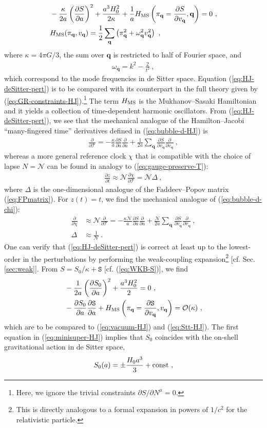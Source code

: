 \documentclass[12pt]{iopart}
\def\eq#1{\begin{equation}\begin{aligned}#1\end{aligned}\end{equation}}
\def\eref#1{(\ref{eq:#1})}
\def\del#1#2{\frac{\partial#1}{\partial#2}}
\def\S{\mathtt{S}}
\def\Ob{\mathcal{O}}
\def\N{\mathcal{N}}
\def\q{\mathbf{q}}
\def\T{\mathcal{T}}
\begin{document}
\eq{\label{eq:HJ-deSitter-pert}
& -\frac{\kappa}{2a}\left(\del{S}{a}\right)^2+\frac{a^3H_0^2}{2\kappa}+\frac{1}{a}H_{\rm MS}\left(\pi_{\q}=\del{S}{v_{\q}},\q\right) = 0 \ , \\
&H_{\rm MS}(\pi_{\q},v_{\q}) = \frac12\sum_{\q}\left(\pi_{\q}^2+\omega_{\q}^2v_{\q}^2\right) \ ,
}
where $\kappa = 4\pi G / 3$, the sum over $\q$ is restricted to half of Fourier space, and
\eq{\label{eq:deSitter-freqs}
\omega_{\q} = k^2-\frac{2}{t^2} \ ,
}
which correspond to the mode frequencies in de Sitter space. Equation \eref{HJ-deSitter-pert} is to be compared with its counterpart in the full theory given by \eref{GR-constraints-HJ}.\footnote{Here, we ignore the trivial constraints $\partial S/\partial N^{\mu}=0$.} The term $H_{\rm MS}$ is the Mukhanov--Sasaki Hamiltonian and it yields a collection of time-dependent harmonic oscillators. From \eref{HJ-deSitter-pert}, we see that the mechanical analogue of the Hamilton--Jacobi ``many-fingered time'' derivatives defined in \eref{bubble-d-HJ} is
\eq{\label{eq:WKB-time-cl}
\del{}{\T} = -\frac{\kappa}{a}\del{S}{a}\del{}{a}+\frac{1}{2a}\sum_{\q}\del{S}{v_{\q}}\del{}{v_{\q}} \ ,
}
whereas a more general reference clock $\chi$ that is compatible with the choice of lapse $N=\N$ can be found in analogy to \eref{gauge-preserve-T}:
\eq{
\del{z}{t} \approx \N\del{\chi}{\T} = \N\Delta \ ,
}
where $\Delta$ is the one-dimensional analogue of the Faddeev--Popov matrix \eref{FPmatrix}. For $z(t) = t$, we find the mechanical analogue of \eref{bubble-d-chi}:
\eq{\label{eq:mechanical-clock}
\del{}{\chi} &\approx \N\del{}{\T} = -\frac{\kappa \N}{a}\del{S}{a}\del{}{a}+\frac{\N}{2a}\sum_{\q}\del{S}{v_{\q}}\del{}{v_{\q}} \ , \\
\Delta &\approx \frac{1}{\N} \ .
}
One can verify that \eref{HJ-deSitter-pert} is correct at least up to the lowest-order in the perturbations by performing the weak-coupling expansion\footnote{This is directly analogous to a formal expansion in powers of $1/c^2$ for the relativistic particle.} [cf. Sec. \ref{sec:weak}]. From $S = S_0/\kappa+\S$ [cf. \eref{WKB-S}], we find
\eq{\label{eq:minisuper-HJ}
&-\frac{1}{2a}\left(\del{S_0}{a}\right)^2+\frac{a^3H_0^2}{2} = 0 \ , \\
&-\del{S_0}{a}\del{\S}{a}+H_{\rm MS}\left(\pi_{\q}=\del{\S}{v_{\q}},v_{\q}\right) = \Ob(\kappa) \ , 
}
which are to be compared to \eref{vacuum-HJ} and \eref{Stt-HJ}. The first equation in \eref{minisuper-HJ} implies that $S_0$ coincides with the on-shell gravitational action in de Sitter space,
\eq{\label{eq:deSitter-action}
S_0(a) = \pm\frac{H_0 a^3}{3} + {\rm const} \ ,
}
\end{document}
